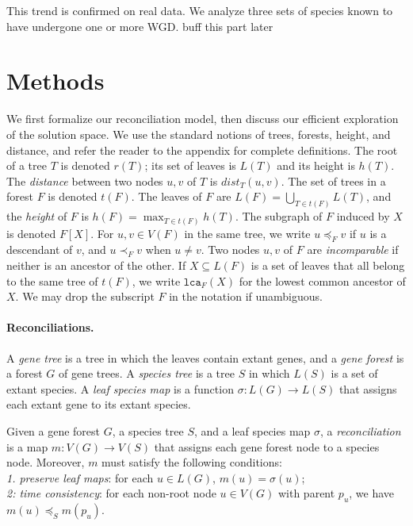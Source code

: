 \documentclass[10pt]{article}
\newcommand{\lca}{\texttt{lca}}
\newcommand{\ml}[1]{\begingroup\color{blue}#1\endgroup}
\begin{document}
This trend is confirmed on real data.  We analyze three sets of species known to have undergone one or more WGD.  \ml{buff this part later}








\section{Methods}

We first formalize our reconciliation model, then discuss our efficient exploration of the solution space.
We use the standard notions of trees, forests, height, and distance, and refer the reader to the appendix for complete definitions.
The root of a tree $T$ is denoted $r(T)$;  its set of leaves is $L(T)$ and its height is $h(T)$.  The \emph{distance} between two nodes $u, v$ of $T$ is $dist_T(u, v)$. 
The set of trees in a forest $F$ is denoted $t(F)$.  The leaves of $F$ are $L(F) = \bigcup_{T \in t(F)} L(T)$, and the \emph{height} of $F$ is $h(F) = \max_{T \in t(F)} h(T)$.
The subgraph of $F$ induced by $X$ is denoted $F[X]$.
For $u, v \in V(F)$ in the same tree, we write $u \preceq_F v$ if $u$ is a descendant of $v$, and $u \prec_F v$ when $u \neq v$.  Two nodes $u, v$ of $F$ are \emph{incomparable} if neither is an ancestor of the other.
If $X \subseteq L(F)$ is a set of leaves that all belong to the same tree of $t(F)$, we write $\lca_F(X)$ for the lowest common ancestor of $X$.   We may drop the subscript $F$ in the notation if unambiguous.











\paragraph{Reconciliations.}
A \emph{gene tree} is a tree in which the leaves contain extant genes, and 
a \emph{gene forest} is a forest $G$ of gene trees.  A \emph{species tree} is a tree $S$ in which $L(S)$ is a set of extant species. 
A \emph{leaf species map} is a function $\sigma : L(G) \rightarrow L(S)$ that assigns each extant gene to its extant species.

Given a gene forest $G$, a species tree $S$, and a leaf species map $\sigma$, a \emph{reconciliation} is a map $m : V(G) \rightarrow V(S)$ that assigns each gene forest node to a species node.
Moreover, $m$ must satisfy the following conditions:\\
\emph{1. preserve leaf maps}: for each $u \in L(G)$, $m(u)=\sigma(u)$;\\
\emph{2: time consistency}: for each non-root node $u \in V(G)$ with parent $p_u$, we have $m(u) \preceq_S m(p_u)$.
\end{document}
